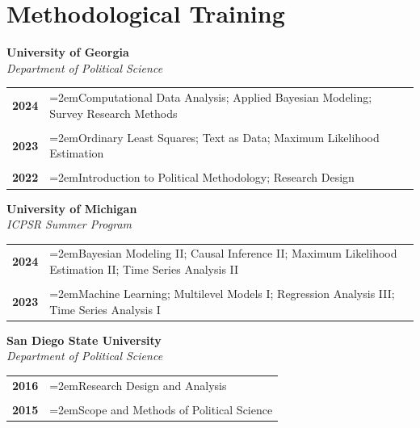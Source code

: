 \documentclass[letterpaper,12pt]{article}
\begin{document}
\section{Methodological Training}
\textbf{University of Georgia}\\
\textit{Department of Political Science}
\begin{xltabular}{\dimexpr\textwidth-0in}{p{1.5in}X}
\textbf{2024} 			& \hangindent=2emComputational Data Analysis; Applied Bayesian Modeling; Survey Research \mbox{Methods}\\ \\

\textbf{2023} 			& \hangindent=2emOrdinary Least Squares; Text as Data; Maximum Likelihood Estimation\\ \\

\textbf{2022} 			& \hangindent=2emIntroduction to Political Methodology; Research Design
\end{xltabular}
\par
\textbf{University of Michigan}\\
\textit{ICPSR Summer Program}
\begin{xltabular}{\dimexpr\textwidth-0in}{p{1.5in}X}
\textbf{2024} 			& \hangindent=2emBayesian Modeling II; Causal Inference II; Maximum Likelihood Estimation II; Time Series Analysis II\\ \\

\textbf{2023} 			& \hangindent=2emMachine Learning; Multilevel Models I; Regression Analysis III; Time Series \mbox{Analysis} I
\end{xltabular}
\par
\textbf{San Diego State University}\\
\textit{Department of Political Science}
\begin{xltabular}{\dimexpr\textwidth-0in}{p{1.5in}X}
\textbf{2016} 			& \hangindent=2emResearch Design and Analysis\\ \\

\textbf{2015} 			& \hangindent=2emScope and Methods of Political Science
\end{xltabular}

\end{document}
